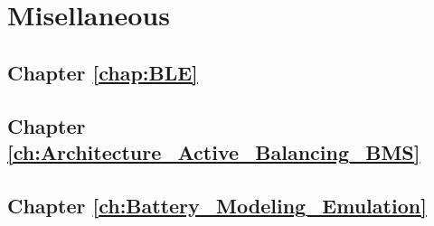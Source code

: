 \chapter{Misellaneous}\label{chap:miselleneous}
\section{Chapter \ref{chap:BLE}}

\section{Chapter \ref{ch:Architecture_Active_Balancing_BMS}}

\section{Chapter \ref{ch:Battery_Modeling_Emulation}}
